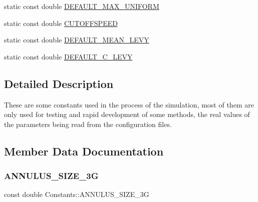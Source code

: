 \begin{DoxyCompactItemize}
\item 
static const double \hyperlink{class_constants_a8a4671c81f16a6952a2533e983befc93}{D\+E\+F\+A\+U\+L\+T\+\_\+\+M\+A\+X\+\_\+\+U\+N\+I\+F\+O\+RM}
\item 
static const double \hyperlink{class_constants_a62ab8ab582731606c42f264b53fc3e69}{C\+U\+T\+O\+F\+F\+S\+P\+E\+ED}
\item 
static const double \hyperlink{class_constants_a375dbd64a60179f9fcaf1c7b7606bad6}{D\+E\+F\+A\+U\+L\+T\+\_\+\+M\+E\+A\+N\+\_\+\+L\+E\+VY}
\item 
static const double \hyperlink{class_constants_a942c5242af9de9d6545e690268450c03}{D\+E\+F\+A\+U\+L\+T\+\_\+\+C\+\_\+\+L\+E\+VY}
\end{DoxyCompactItemize}


\subsection{Detailed Description}
These are some constants used in the process of the simulation, most of them are only used for testing and rapid development of some methods, the real values of the parameters being read from the configuration files. 

\subsection{Member Data Documentation}
\mbox{\label{class_constants_a66de7fc72fc30ccf2599816cf607c14c}} 
\subsubsection{\texorpdfstring{A\+N\+N\+U\+L\+U\+S\+\_\+\+S\+I\+Z\+E\+\_\+3G}{ANNULUS\_SIZE\_3G}}
{\footnotesize\ttfamily const double Constants\+::\+A\+N\+N\+U\+L\+U\+S\+\_\+\+S\+I\+Z\+E\+\_\+3G\hspace{0.3cm}{\ttfamily [static]}}

\mbox{\label{class_constants_a8ff3d2e927af8b78332fcf1d72891fc7}} 
